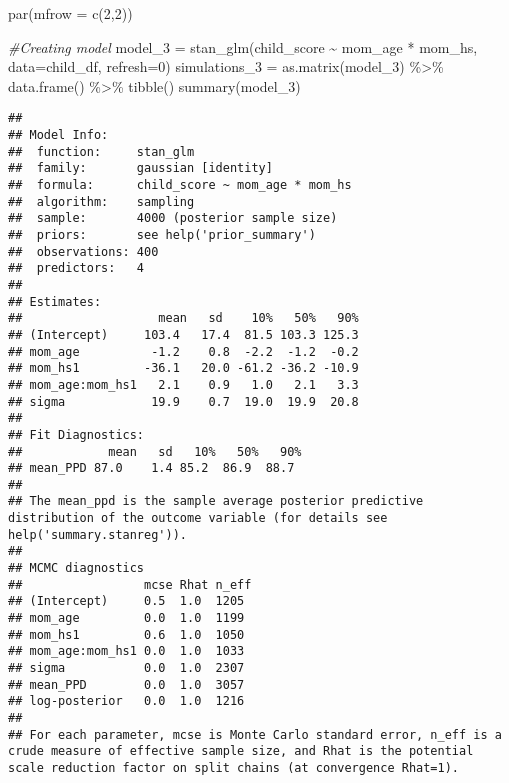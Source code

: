 \documentclass[
]{article}
\newenvironment{Shaded}{\begin{snugshade}}{\end{snugshade}}
\newcommand{\AttributeTok}[1]{\textcolor[rgb]{0.77,0.63,0.00}{#1}}
\newcommand{\CommentTok}[1]{\textcolor[rgb]{0.56,0.35,0.01}{\textit{#1}}}
\newcommand{\DecValTok}[1]{\textcolor[rgb]{0.00,0.00,0.81}{#1}}
\newcommand{\FunctionTok}[1]{\textcolor[rgb]{0.00,0.00,0.00}{#1}}
\newcommand{\NormalTok}[1]{#1}
\newcommand{\OtherTok}[1]{\textcolor[rgb]{0.56,0.35,0.01}{#1}}
\newcommand{\SpecialCharTok}[1]{\textcolor[rgb]{0.00,0.00,0.00}{#1}}
\begin{document}
\begin{Shaded}
\begin{Highlighting}[]
\FunctionTok{par}\NormalTok{(}\AttributeTok{mfrow =} \FunctionTok{c}\NormalTok{(}\DecValTok{2}\NormalTok{,}\DecValTok{2}\NormalTok{))}

\CommentTok{\#Creating model}
\NormalTok{model\_3 }\OtherTok{=} \FunctionTok{stan\_glm}\NormalTok{(child\_score }\SpecialCharTok{\textasciitilde{}}\NormalTok{ mom\_age }\SpecialCharTok{*}\NormalTok{ mom\_hs, }\AttributeTok{data=}\NormalTok{child\_df, }\AttributeTok{refresh=}\DecValTok{0}\NormalTok{)}
\NormalTok{simulations\_3 }\OtherTok{=} \FunctionTok{as.matrix}\NormalTok{(model\_3) }\SpecialCharTok{\%\textgreater{}\%} \FunctionTok{data.frame}\NormalTok{() }\SpecialCharTok{\%\textgreater{}\%} \FunctionTok{tibble}\NormalTok{()}
\FunctionTok{summary}\NormalTok{(model\_3)}
\end{Highlighting}
\end{Shaded}

\begin{verbatim}
## 
## Model Info:
##  function:     stan_glm
##  family:       gaussian [identity]
##  formula:      child_score ~ mom_age * mom_hs
##  algorithm:    sampling
##  sample:       4000 (posterior sample size)
##  priors:       see help('prior_summary')
##  observations: 400
##  predictors:   4
## 
## Estimates:
##                   mean   sd    10%   50%   90%
## (Intercept)     103.4   17.4  81.5 103.3 125.3
## mom_age          -1.2    0.8  -2.2  -1.2  -0.2
## mom_hs1         -36.1   20.0 -61.2 -36.2 -10.9
## mom_age:mom_hs1   2.1    0.9   1.0   2.1   3.3
## sigma            19.9    0.7  19.0  19.9  20.8
## 
## Fit Diagnostics:
##            mean   sd   10%   50%   90%
## mean_PPD 87.0    1.4 85.2  86.9  88.7 
## 
## The mean_ppd is the sample average posterior predictive distribution of the outcome variable (for details see help('summary.stanreg')).
## 
## MCMC diagnostics
##                 mcse Rhat n_eff
## (Intercept)     0.5  1.0  1205 
## mom_age         0.0  1.0  1199 
## mom_hs1         0.6  1.0  1050 
## mom_age:mom_hs1 0.0  1.0  1033 
## sigma           0.0  1.0  2307 
## mean_PPD        0.0  1.0  3057 
## log-posterior   0.0  1.0  1216 
## 
## For each parameter, mcse is Monte Carlo standard error, n_eff is a crude measure of effective sample size, and Rhat is the potential scale reduction factor on split chains (at convergence Rhat=1).
\end{verbatim}

\begin{Shaded}
\end{Shaded}
\end{document}
